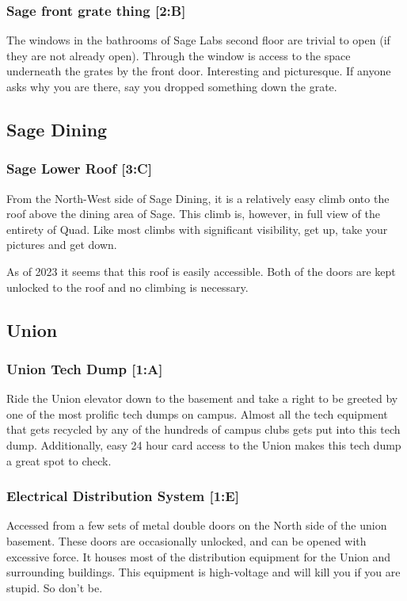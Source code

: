 \documentclass{article}
\begin{document}
\subsubsection{Sage front grate thing [2:B]}
The windows in the bathrooms of Sage Labs second floor are trivial to open (if they are not already open). Through the window is access to the space underneath the grates by the front door. Interesting and picturesque. If anyone asks why you are there, say you dropped something down the grate.
\pagebreak
\subsection{Sage Dining}
\subsubsection{Sage Lower Roof [3:C]}
From the North-West side of Sage Dining, it is a relatively easy climb onto the roof above the dining area of Sage. This climb is, however, in full view of the entirety of Quad. Like most climbs with significant visibility, get up, take your pictures and get down.

As of 2023 it seems that this roof is easily accessible. Both of the doors are kept unlocked to the roof and no climbing is necessary.
\pagebreak
\subsection{Union}
\subsubsection{Union Tech Dump [1:A]}
Ride the Union elevator down to the basement and take a right to be greeted by one of the most prolific tech dumps on campus. Almost all the tech equipment that gets recycled by any of the hundreds of campus clubs gets put into this tech dump. Additionally, easy 24 hour card access to the Union makes this tech dump a great spot to check.

 \subsubsection{Electrical Distribution System [1:E]}
Accessed from a few sets of metal double doors on the North side of the union basement. These doors are occasionally unlocked, and can be opened with excessive force. It houses most of the distribution equipment for the Union and surrounding buildings. This equipment is high-voltage and will kill you if you are stupid. So don’t be.
\pagebreak
\end{document}
